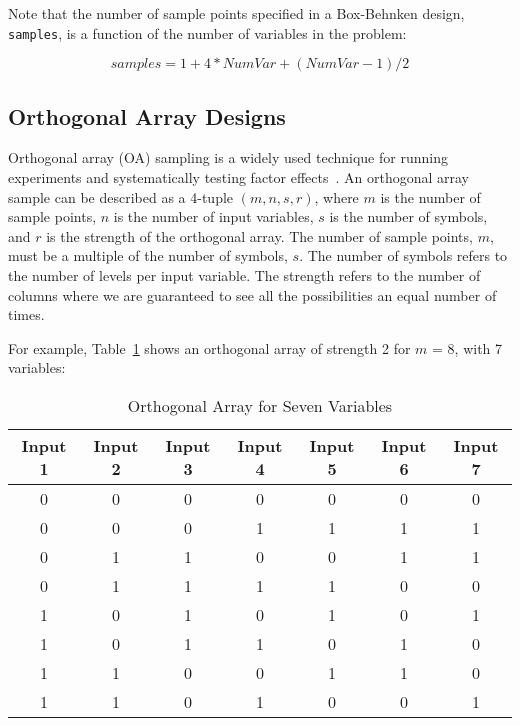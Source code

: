 Note that the number of sample points specified in a Box-Behnken design,
\texttt{samples}, is a function of the number of variables in the problem: 

\[
samples = 1 + 4*NumVar + (NumVar-1)/2
\]

\subsection{Orthogonal Array Designs}\label{dace:oas}

Orthogonal array (OA) sampling is a widely used technique for 
running experiments and systematically testing factor effects~\cite{Hed99}. 
An orthogonal array sample can be described as a 4-tuple $(m,n,s,r)$,
where $m$ is the number of sample points, $n$ is the number of input variables, 
$s$ is the number of symbols, and $r$ is the strength of the orthogonal array. 
The number of sample points, $m$, must be a multiple of the number of symbols, 
$s$.  The number of symbols refers to the number of levels per input variable. 
The strength refers to the number of columns where we are guaranteed to 
see all the possibilities an equal number of times.

For example, Table~\ref{dace:table03} shows an orthogonal array of strength 2 for $m$ = 8, with 7 variables:

\begin{table}[ht]
 \caption{Orthogonal Array for Seven Variables}
 \label{dace:table03}
 \begin{center}
  \begin{tabular}{c|c|c|c|c|c|c}
  \hline
  Input 1 & Input 2 & Input 3 & Input 4 & Input 5 & Input 6 & Input 7\\ \hline \hline 
0 & 	0 &	0 &	0 & 	0 &	0 &	0  \\ \hline
0 &	0 &	0 &	1 &	1 &	1 &	1   \\ \hline
0 &	1 & 	1 & 	0 & 	0 &	1 &	1   \\ \hline
0 &	1 &	1 &	1 &	1 &	0 &	0    \\ \hline
1 &	0 &	1 &	0 &	1 &	0 &	1   \\ \hline
1 &	0 &	1 &	1 &	0 &	1 &	0 \\ \hline
1 &	1 &	0 &	0 &	1 &	1 &	0 \\ \hline
1 &	1 &	0 &	1 &	0 &	0 &	1 \\ \hline

  \end{tabular}
\end{center}
\end{table}


